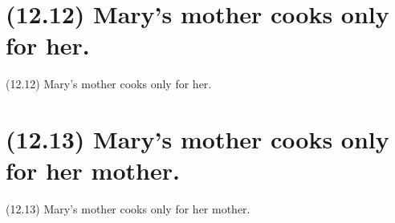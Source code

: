 \documentclass{article}
\begin{document}
\clearpage

%
%

\section*{(12.12) Mary's mother cooks only for her.}

\bigbreak
\begin{enumerate*}
\item[(12.12)] Mary's mother cooks only for her.
\end{enumerate*}
\bigbreak

\bigbreak
\begin{minipage}{\textwidth}
\end{minipage}
\bigbreak

\clearpage

%
%

\section*{(12.13) Mary's mother cooks only for her mother.}

\bigbreak
\begin{enumerate*}
\item[(12.13)] Mary's mother cooks only for her mother.
\end{enumerate*}
\bigbreak

\bigbreak
\begin{minipage}{\textwidth}
\end{minipage}
\bigbreak
\end{document}
